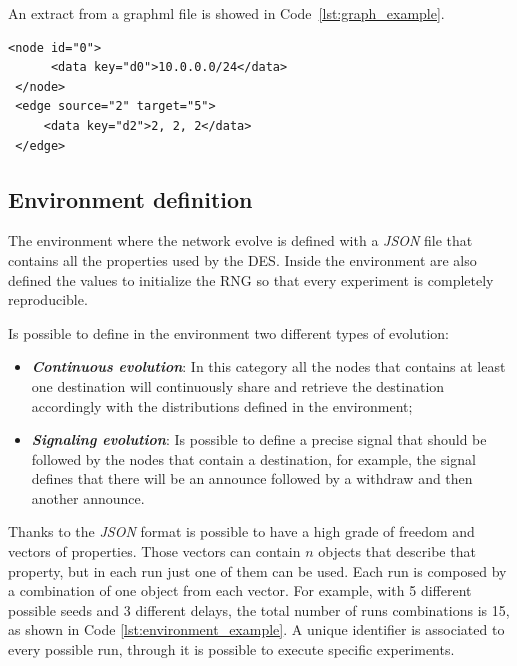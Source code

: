 An extract from a graphml file is showed in Code~\ref{lst:graph_example}.
\begin{lstlisting}[language=graphml, caption=Graph example, label=lst:graph_example]
 <node id="0">
      <data key="d0">10.0.0.0/24</data>
 </node>
 <edge source="2" target="5">
     <data key="d2">2, 2, 2</data>
 </edge>
\end{lstlisting}

\subsection{Environment definition}
\label{subsec:exp_environments_definition}

The environment where the network evolve is defined with a \textit{JSON}
file that contains all the properties used by the \ac{DES}.
Inside the environment are also defined the values to initialize the \ac{RNG}
so that every experiment is completely reproducible.

Is possible to define in the environment two different types of evolution:
\begin{itemize}
    \item \textbf{\textit{Continuous evolution}}: In this category all the nodes
    that contains at least one destination will continuously share and retrieve
    the destination accordingly with the distributions defined in the environment;
    \item \textbf{\textit{Signaling evolution}}: Is possible to define a precise
    signal that should be followed by the nodes that contain a destination, for
    example, the signal  defines that there will be an announce followed by
    a withdraw and then another announce.
\end{itemize}

Thanks to the \textit{JSON} format is possible to have a high grade of
freedom and vectors of properties.
Those vectors can contain $n$ objects that describe that property, but in each
run just one of them can be used.
Each run is composed by a combination of one object from each vector.
For example, with \num{5} different possible seeds and \num{3} different
delays, the total number of runs combinations is \num{15}, as shown in Code
\ref{lst:environment_example}.
A unique identifier is associated to every possible run, through it is possible
to execute specific experiments.

